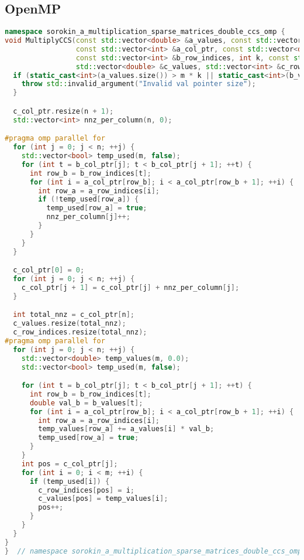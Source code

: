\documentclass[12pt]{article}
\begin{document}
\subsection*{OpenMP}
\begin{lstlisting}[language=C++]
namespace sorokin_a_multiplication_sparse_matrices_double_ccs_omp {
void MultiplyCCS(const std::vector<double> &a_values, const std::vector<int> &a_row_indices, int m,
                 const std::vector<int> &a_col_ptr, const std::vector<double> &b_values,
                 const std::vector<int> &b_row_indices, int k, const std::vector<int> &b_col_ptr,
                 std::vector<double> &c_values, std::vector<int> &c_row_indices, int n, std::vector<int> &c_col_ptr) {
  if (static_cast<int>(a_values.size()) > m * k || static_cast<int>(b_values.size()) > k * n) {
    throw std::invalid_argument("Invalid val pointer size");
  }

  c_col_ptr.resize(n + 1);
  std::vector<int> nnz_per_column(n, 0);

#pragma omp parallel for
  for (int j = 0; j < n; ++j) {
    std::vector<bool> temp_used(m, false);
    for (int t = b_col_ptr[j]; t < b_col_ptr[j + 1]; ++t) {
      int row_b = b_row_indices[t];
      for (int i = a_col_ptr[row_b]; i < a_col_ptr[row_b + 1]; ++i) {
        int row_a = a_row_indices[i];
        if (!temp_used[row_a]) {
          temp_used[row_a] = true;
          nnz_per_column[j]++;
        }
      }
    }
  }

  c_col_ptr[0] = 0;
  for (int j = 0; j < n; ++j) {
    c_col_ptr[j + 1] = c_col_ptr[j] + nnz_per_column[j];
  }

  int total_nnz = c_col_ptr[n];
  c_values.resize(total_nnz);
  c_row_indices.resize(total_nnz);
#pragma omp parallel for
  for (int j = 0; j < n; ++j) {
    std::vector<double> temp_values(m, 0.0);
    std::vector<bool> temp_used(m, false);

    for (int t = b_col_ptr[j]; t < b_col_ptr[j + 1]; ++t) {
      int row_b = b_row_indices[t];
      double val_b = b_values[t];
      for (int i = a_col_ptr[row_b]; i < a_col_ptr[row_b + 1]; ++i) {
        int row_a = a_row_indices[i];
        temp_values[row_a] += a_values[i] * val_b;
        temp_used[row_a] = true;
      }
    }
    int pos = c_col_ptr[j];
    for (int i = 0; i < m; ++i) {
      if (temp_used[i]) {
        c_row_indices[pos] = i;
        c_values[pos] = temp_values[i];
        pos++;
      }
    }
  }
}
}  // namespace sorokin_a_multiplication_sparse_matrices_double_ccs_omp
\end{lstlisting}
\end{document}
